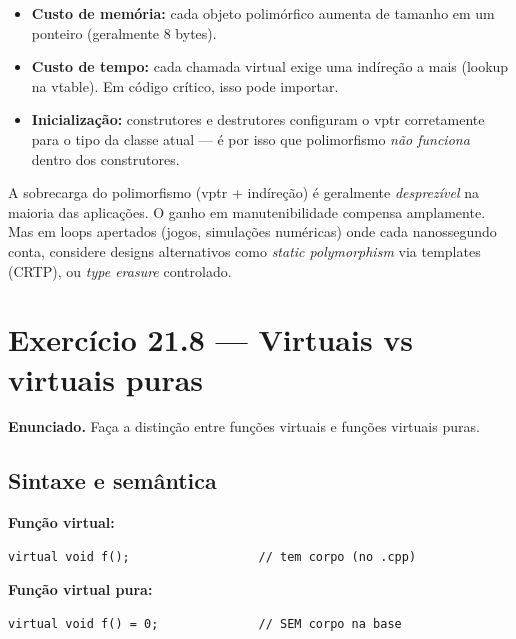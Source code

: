 \documentclass[11pt,a4paper]{article}
\begin{document}
\begin{itemize}[leftmargin=*,itemsep=0pt]
  \item \textbf{Custo de mem\'oria:} cada objeto polim\'orfico aumenta de tamanho em um ponteiro (geralmente 8 bytes).
  \item \textbf{Custo de tempo:} cada chamada virtual exige uma ind\'ire\c{c}\~ao a mais (lookup na vtable). Em c\'odigo cr\'itico, isso pode importar.
  \item \textbf{Inicializa\c{c}\~ao:} construtores e destrutores configuram o vptr corretamente para o tipo da classe atual --- \'e por isso que polimorfismo \emph{n\~ao funciona} dentro dos construtores.
\end{itemize}

\begin{dicadesemp}
A sobrecarga do polimorfismo (vptr + ind\'ire\c{c}\~ao) \'e geralmente \emph{desprez\'ivel} na maioria das aplica\c{c}\~oes. O ganho em manutenibilidade compensa amplamente. Mas em loops apertados (jogos, simula\c{c}\~oes num\'ericas) onde cada nanossegundo conta, considere designs alternativos como \emph{static polymorphism} via templates (CRTP), ou \emph{type erasure} controlado.
\end{dicadesemp}

\section{Exerc\'icio 21.8 --- Virtuais vs virtuais puras}

\begin{enunciado}
\textbf{Enunciado.} Fa\c{c}a a distin\c{c}\~ao entre fun\c{c}\~oes virtuais e fun\c{c}\~oes virtuais puras.
\end{enunciado}

\subsection*{Sintaxe e sem\^antica}

\textbf{Fun\c{c}\~ao virtual:}
\begin{lstlisting}[style=cppcode,numbers=none]
virtual void f();                  // tem corpo (no .cpp)
\end{lstlisting}

\textbf{Fun\c{c}\~ao virtual pura:}
\begin{lstlisting}[style=cppcode,numbers=none]
virtual void f() = 0;              // SEM corpo na base
\end{lstlisting}
\end{document}
